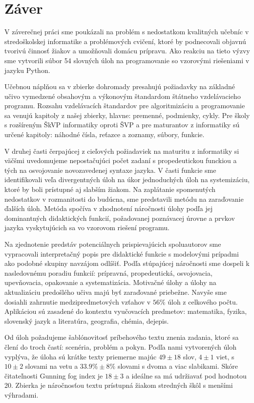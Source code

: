 \chapter{Záver}
V záverečnej práci sme poukázali na problém s nedostatkom kvalitných učebníc v stredoškolskej informatike a problémových cvičení, ktoré by podnecovali objavnú tvorivú činnosť žiakov a umožňovali domácu prípravu. Ako reakciu na tieto výzvy sme vytvorili súbor 54 slovných úloh na programovanie so vzorovými riešeniami v jazyku Python.

Učebnou náplňou sa v zbierke dohromady presahujú požiadavky na základné učivo vymedzené obsahovým a výkonovým štandardom štátneho vzdelávacieho programu. Rozsahu vzdelávacích štandardov pre algoritmizáciu a programovanie sa venujú kapitoly z našej zbierky, hlavne: premenné, podmienky, cykly. Pre školy s rozšíreným ŠkVP informatiky oproti ŠVP a pre maturantov z informatiky sú určené kapitoly: náhodné čísla, reťazce a zoznamy, súbory, funkcie.

V druhej časti čerpajúcej z cieľových požiadaviek na maturitu z informatiky si väčšmi uvedomujeme nepostačujúci počet zadaní s propedeutickou funckiou a tých na osvojovanie novozavedenej syntaxe jazyka. V časti funkcie sme identifikovali veľa divergentných úloh na úkor jednoduchých úloh na systemizáciu, ktoré by boli prístupné aj slabším žiakom. Na zaplátanie spomenutých nedostatkov v rozmanitosti do budúcna, sme predstavili metódu na zaraďovanie ďalších úloh. Metóda spočíva v zhodnotení náročnosti úlohy podľa jej dominantných didaktických funkcií, požadovanej poznávacej úrovne a prvkov jazyka vyskytujúcich sa vo vzorovom riešení programu.

Na zjednotenie predstáv potenciálnych prispievajúcich spoluautorov sme vypracovali interpretačný popis pre didaktické funkcie s modelovými prípadmi ako podobné skupiny navzájom odlíšiť. Podľa stúpajúcej náročnosti sme dospeli k nasledovnému poradiu funkcií: prípravná, propedeutická, osvojovacia, upevňovacia, opakovanie a systematizácia. Motivačné úlohy a úlohy na aktualizáciu predošlého učiva majú byť zaraďované priebežne. Navyše sme dosiahli zahrnutie medzipredmetových vzťahov v $56 \%$ úloh z celkového počtu. Aplikáciou sú zasadené do kontextu vyučovacích predmetov: matematika, fyzika, slovenský jazyk a literatúra, geografia, chémia, dejepis.

Od úloh požadujeme šablónovitosť príbehového textu znenia zadania, ktoré sa člení do troch častí: scenéria, problém a pokyn. Podľa nami vytvorených úloh vyplýva, že úloha sú krátke texty priemerne majúc $49 \pm 18$ slov, $4 \pm 1$ viet, s $10 \pm 2$ slovami na vetu a $33.9\% \pm 8\%$ slovami s dvoma a viac slabikami. Skóre čitateľnosti Gunning fog index je $18 \pm 3$ a ideálne sa má udržiavať pod hodnotou 20. Zbierka je náročnosťou textu prístupná žiakom stredných škôl s menšími výhradami.


